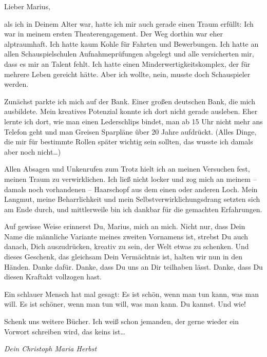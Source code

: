 \documentclass[fontsize=14pt,a4paper,headinclude,DIV=calc,automark]{scrbook}
\begin{document}
\vspace{-1\baselineskip}
Lieber Marius,\par
\vspace{0\baselineskip}

\noindent als ich in Deinem Alter war, hatte ich mir auch gerade einen Traum erfüllt: Ich war in meinem ersten Theaterengagement.
Der Weg dorthin war eher alptraumhaft. Ich hatte kaum Kohle für Fahrten und Bewerbungen. Ich hatte an allen Schauspielschulen Aufnahmeprüfungen abgelegt und alle versicherten mir, dass es mir an Talent fehlt. Ich hatte einen Minderwertigkeitskomplex, der für mehrere Leben gereicht hätte.
Aber ich wollte, nein, musste doch Schauspieler werden.

Zunächst parkte ich mich auf der Bank. Einer großen deutschen Bank, die mich ausbildete. Mein kreatives Potenzial konnte ich dort nicht gerade ausleben. Eher lernte ich dort, wie man einen Lederschlips bindet, man ab 15 Uhr nicht mehr ans Telefon geht und man Greisen Sparpläne über 20 Jahre aufdrückt. (Alles Dinge, die mir für bestimmte Rollen später wichtig sein sollten, das wusste ich damals aber noch nicht…)

Allen Absagen und Unkenrufen zum Trotz hielt ich an meinen Versuchen fest, meinen Traum zu verwirklichen.
Ich ließ nicht locker und zog mich an meinem – damals noch vorhandenen – Haarschopf aus dem einen oder anderen Loch. Mein Langmut, meine Beharrlichkeit und mein Selbstverwirklichungsdrang setzten sich am Ende durch, und mittlerweile bin ich dankbar für die gemachten Erfahrungen.

Auf gewisse Weise erinnerst Du, Marius, mich an mich. Nicht nur, dass Dein Name die männliche Variante meines zweiten Vornamens ist, strebst Du auch danach, Dich auszudrücken, kreativ zu sein, der Welt etwas zu schenken. Und dieses Geschenk, das gleichsam Dein Vermächtnis ist, halten wir nun in den Händen.
Danke dafür. Danke, dass Du uns an Dir teilhaben lässt. Danke, dass Du diesen Kraftakt vollzogen hast.

Ein schlauer Mensch hat mal gesagt: Es ist schön, wenn man tun kann, was man will. Es ist schöner, wenn man tun will, was man kann.
Du kannst. Und wie!

Schenk uns weitere Bücher. Ich weiß schon jemanden, der gerne wieder ein Vorwort schreiben wird, das keins ist…

\vspace{0.5cm}
\noindent\textit{Dein Christoph Maria Herbst}
\end{document}
